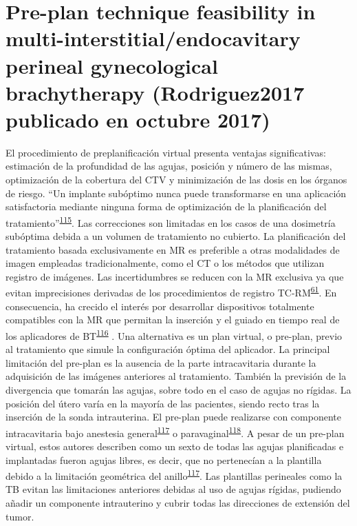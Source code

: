 \documentclass[
  a4paper,
]{scrreprt}
\begin{document}
\hypertarget{pre-plan-technique-feasibility-in-multi-interstitialendocavitary-perineal-gynecological-brachytherapy-rodriguez2017-publicado-en-octubre-2017-2}{%
\section{Pre-plan technique feasibility in
multi-interstitial/endocavitary perineal gynecological brachytherapy
(Rodriguez2017 publicado en octubre
2017)}\label{pre-plan-technique-feasibility-in-multi-interstitialendocavitary-perineal-gynecological-brachytherapy-rodriguez2017-publicado-en-octubre-2017-2}}

El procedimiento de preplanificación virtual presenta ventajas
significativas: estimación de la profundidad de las agujas, posición y
número de las mismas, optimización de la cobertura del CTV y
minimización de las dosis en los órganos de riesgo. ``Un implante
subóptimo nunca puede transformarse en una aplicación satisfactoria
mediante ninguna forma de optimización de la planificación del
tratamiento''\textsuperscript{\protect\hyperlink{ref-gecestrohandbook2002}{115}}.
Las correcciones son limitadas en los casos de una dosimetría subóptima
debida a un volumen de tratamiento no cubierto. La planificación del
tratamiento basada exclusivamente en MR es preferible a otras
modalidades de imagen empleadas tradicionalmente, como el CT o los
métodos que utilizan registro de imágenes. Las incertidumbres se reducen
con la MR exclusiva ya que evitan imprecisiones derivadas de los
procedimientos de registro
TC-RM\textsuperscript{\protect\hyperlink{ref-hellebust2010}{61}}. En
consecuencia, ha crecido el interés por desarrollar dispositivos
totalmente compatibles con la MR que permitan la inserción y el guiado
en tiempo real de los aplicadores de
BT\textsuperscript{\protect\hyperlink{ref-viswanathan2006}{116}} . Una
alternativa es un plan virtual, o pre-plan, previo al tratamiento que
simule la configuración óptima del aplicador. La principal limitación
del pre-plan es la ausencia de la parte intracavitaria durante la
adquisición de las imágenes anteriores al tratamiento. También la
previsión de la divergencia que tomarán las agujas, sobre todo en el
caso de agujas no rígidas. La posición del útero varía en la mayoría de
las pacientes, siendo recto tras la inserción de la sonda intrauterina.
El pre-plan puede realizarse con componente intracavitaria bajo
anestesia
general\textsuperscript{\protect\hyperlink{ref-fokdal2013}{117}} o
paravaginal\textsuperscript{\protect\hyperlink{ref-petric2014c}{118}}. A
pesar de un pre-plan virtual, estos autores describen como un sexto de
todas las agujas planificadas e implantadas fueron agujas libres, es
decir, que no pertenecían a la plantilla debido a la limitación
geométrica del
anillo\textsuperscript{\protect\hyperlink{ref-fokdal2013}{117}}. Las
plantillas perineales como la TB evitan las limitaciones anteriores
debidas al uso de agujas rígidas, pudiendo añadir un componente
intrauterino y cubrir todas las direcciones de extensión del tumor.
\end{document}
